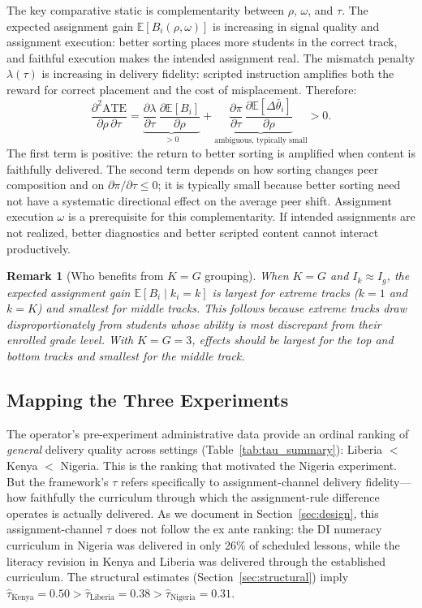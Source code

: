 \documentclass[11pt]{article}
\newtheorem{remark}{Remark}
\newcommand{\E}{\mathbb{E}}
\begin{document}
The key comparative static is complementarity between $\rho$, $\omega$, and $\tau$. The expected assignment gain $\E[B_i(\rho,\omega)]$ is increasing in signal quality and assignment execution: better sorting places more students in the correct track, and faithful execution makes the intended assignment real. The mismatch penalty $\lambda(\tau)$ is increasing in delivery fidelity: scripted instruction amplifies both the reward for correct placement and the cost of misplacement. Therefore:
\begin{equation}
\label{eq:complementarity}
\frac{\partial^2 \text{ATE}}{\partial \rho \, \partial \tau} = \underbrace{\frac{\partial \lambda}{\partial \tau}\,\frac{\partial \E[B_i]}{\partial \rho}}_{> 0} + \underbrace{\frac{\partial \pi}{\partial \tau}\,\frac{\partial \E[\Delta\bar{\theta}_i]}{\partial \rho}}_{\text{ambiguous, typically small}} > 0.
\end{equation}
The first term is positive: the return to better sorting is amplified when content is faithfully delivered. The second term depends on how sorting changes peer composition and on $\partial\pi/\partial\tau \leq 0$; it is typically small because better sorting need not have a systematic directional effect on the average peer shift. Assignment execution $\omega$ is a prerequisite for this complementarity. If intended assignments are not realized, better diagnostics and better scripted content cannot interact productively.

\begin{remark}[Who benefits from $K = G$ grouping]
\label{rem:tail_effects}
When $K = G$ and $I_k \approx I_g$, the expected assignment gain $\E[B_i \mid k_i = k]$ is largest for extreme tracks ($k = 1$ and $k = K$) and smallest for middle tracks. This follows because extreme tracks draw disproportionately from students whose ability is most discrepant from their enrolled grade level. With $K = G = 3$, effects should be largest for the top and bottom tracks and smallest for the middle track.
\end{remark}

\subsection{Mapping the Three Experiments}

The operator's pre-experiment administrative data provide an ordinal ranking of \emph{general} delivery quality across settings (Table~\ref{tab:tau_summary}): Liberia $<$ Kenya $<$ Nigeria. This is the ranking that motivated the Nigeria experiment. But the framework's $\tau$ refers specifically to assignment-channel delivery fidelity---how faithfully the curriculum through which the assignment-rule difference operates is actually delivered. As we document in Section~\ref{sec:design}, this assignment-channel $\tau$ does not follow the ex ante ranking: the DI numeracy curriculum in Nigeria was delivered in only 26\% of scheduled lessons, while the literacy revision in Kenya and Liberia was delivered through the established curriculum. The structural estimates (Section~\ref{sec:structural}) imply $\hat{\tau}_{\text{Kenya}} = 0.50 > \hat{\tau}_{\text{Liberia}} = 0.38 > \hat{\tau}_{\text{Nigeria}} = 0.31$.
\end{document}

